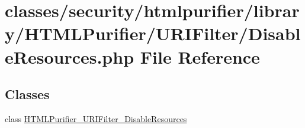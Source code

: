 \hypertarget{DisableResources_8php}{\section{classes/security/htmlpurifier/library/\+H\+T\+M\+L\+Purifier/\+U\+R\+I\+Filter/\+Disable\+Resources.php File Reference}
\label{DisableResources_8php}
}
\subsection*{Classes}
\begin{DoxyCompactItemize}
\item 
class \hyperlink{classHTMLPurifier__URIFilter__DisableResources}{H\+T\+M\+L\+Purifier\+\_\+\+U\+R\+I\+Filter\+\_\+\+Disable\+Resources}
\end{DoxyCompactItemize}
